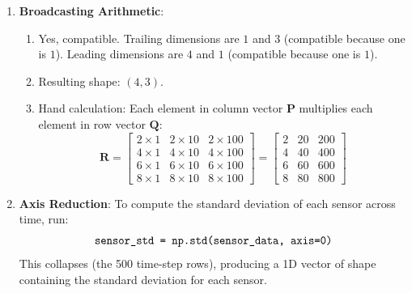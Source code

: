 \begin{enumerate}
    \item \textbf{Broadcasting Arithmetic}:
    \begin{enumerate}[label=(\alph*)]
        \item Yes, compatible. Trailing dimensions are $1$ and $3$ (compatible because one is $1$). Leading dimensions are $4$ and $1$ (compatible because one is $1$).
        \item Resulting shape: $(4, 3)$.
        \item Hand calculation:
        Each element in column vector $\mathbf{P}$ multiplies each element in row vector $\mathbf{Q}$:
        \begin{equation*}
        \mathbf{R} = \begin{bmatrix} 
        2 \times 1 & 2 \times 10 & 2 \times 100 \\ 
        4 \times 1 & 4 \times 10 & 4 \times 100 \\ 
        6 \times 1 & 6 \times 10 & 6 \times 100 \\ 
        8 \times 1 & 8 \times 10 & 8 \times 100 
        \end{bmatrix} = \begin{bmatrix} 
        2 & 20 & 200 \\ 
        4 & 40 & 400 \\ 
        6 & 60 & 600 \\ 
        8 & 80 & 800 
        \end{bmatrix}
        \end{equation*}
    \end{enumerate}

    \item \textbf{Axis Reduction}:
    To compute the standard deviation of each sensor across time, run:
    \begin{equation*}
    \code{sensor_std = np.std(sensor_data, axis=0)}
    \end{equation*}
    This collapses  (the 500 time-step rows), producing a 1D vector of shape  containing the standard deviation for each sensor.


\end{enumerate}
